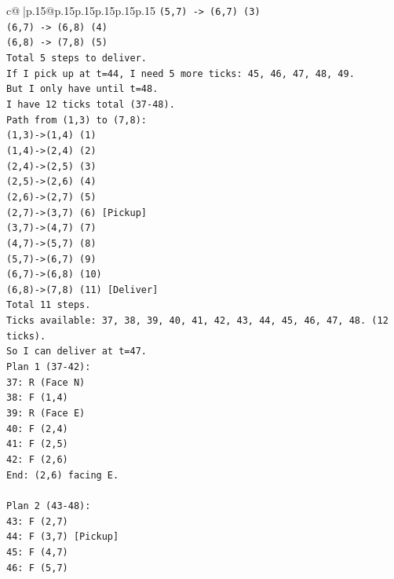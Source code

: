 \documentclass{article}
\begin{document}
{\begin{supertabular}{c@{$\;$}|p{.15\linewidth}@{}p{.15\linewidth}p{.15\linewidth}p{.15\linewidth}p{.15\linewidth}p{.15\linewidth}}
{{{\texttt{(5,7) {-}> (6,7) (3)} \\
\texttt{(6,7) {-}> (6,8) (4)} \\
\texttt{(6,8) {-}> (7,8) (5)} \\
\texttt{Total 5 steps to deliver.} \\
\texttt{If I pick up at t=44, I need 5 more ticks: 45, 46, 47, 48, 49.} \\
\texttt{But I only have until t=48.} \\
\texttt{I have 12 ticks total (37{-}48).} \\
\texttt{Path from (1,3) to (7,8):} \\
\texttt{(1,3){-}>(1,4) (1)} \\
\texttt{(1,4){-}>(2,4) (2)} \\
\texttt{(2,4){-}>(2,5) (3)} \\
\texttt{(2,5){-}>(2,6) (4)} \\
\texttt{(2,6){-}>(2,7) (5)} \\
\texttt{(2,7){-}>(3,7) (6) {[}Pickup{]}} \\
\texttt{(3,7){-}>(4,7) (7)} \\
\texttt{(4,7){-}>(5,7) (8)} \\
\texttt{(5,7){-}>(6,7) (9)} \\
\texttt{(6,7){-}>(6,8) (10)} \\
\texttt{(6,8){-}>(7,8) (11) {[}Deliver{]}} \\
\texttt{Total 11 steps.} \\
\texttt{Ticks available: 37, 38, 39, 40, 41, 42, 43, 44, 45, 46, 47, 48. (12 ticks).} \\
\texttt{So I can deliver at t=47.} \\
\texttt{Plan 1 (37{-}42):} \\
\texttt{37: R (Face N)} \\
\texttt{38: F (1,4)} \\
\texttt{39: R (Face E)} \\
\texttt{40: F (2,4)} \\
\texttt{41: F (2,5)} \\
\texttt{42: F (2,6)} \\
\texttt{End: (2,6) facing E.} \\
\\ 
\texttt{Plan 2 (43{-}48):} \\
\texttt{43: F (2,7)} \\
\texttt{44: F (3,7) {[}Pickup{]}} \\
\texttt{45: F (4,7)} \\
\texttt{46: F (5,7)} \\
}}}
\end{supertabular}}
\end{document}
